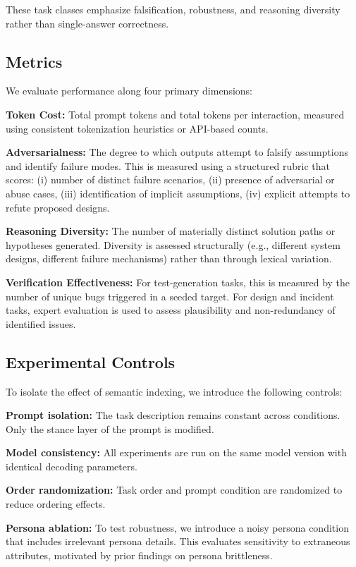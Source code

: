 \documentclass[11pt]{article}
\begin{document}
These task classes emphasize falsification, robustness, and reasoning diversity rather than single-answer correctness.

\subsection{Metrics}

We evaluate performance along four primary dimensions:

\textbf{Token Cost:}  
Total prompt tokens and total tokens per interaction, measured using consistent tokenization heuristics or API-based counts.

\textbf{Adversarialness:}  
The degree to which outputs attempt to falsify assumptions and identify failure modes. This is measured using a structured rubric that scores:
(i) number of distinct failure scenarios,
(ii) presence of adversarial or abuse cases,
(iii) identification of implicit assumptions,
(iv) explicit attempts to refute proposed designs.

\textbf{Reasoning Diversity:}  
The number of materially distinct solution paths or hypotheses generated. Diversity is assessed structurally (e.g., different system designs, different failure mechanisms) rather than through lexical variation.

\textbf{Verification Effectiveness:}  
For test-generation tasks, this is measured by the number of unique bugs triggered in a seeded target. For design and incident tasks, expert evaluation is used to assess plausibility and non-redundancy of identified issues.

\subsection{Experimental Controls}

To isolate the effect of semantic indexing, we introduce the following controls:

\textbf{Prompt isolation:}  
The task description remains constant across conditions. Only the stance layer of the prompt is modified.

\textbf{Model consistency:}  
All experiments are run on the same model version with identical decoding parameters.

\textbf{Order randomization:}  
Task order and prompt condition are randomized to reduce ordering effects.

\textbf{Persona ablation:}  
To test robustness, we introduce a noisy persona condition that includes irrelevant persona details. This evaluates sensitivity to extraneous attributes, motivated by prior findings on persona brittleness.
\end{document}
